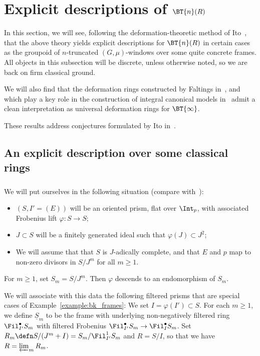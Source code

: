 \documentclass[10pt]{amsart}
\begin{document}
\section{Explicit descriptions of $\BT{n}(R)$}
\label{sec:explicit}

In this section, we will see, following the deformation-theoretic method of Ito~\cite{ito2023deformation}, that the above theory yields explicit descriptions for $\BT{n}(R)$ in certain cases as the groupoid of $n$-truncated $(G,\mu)$-windows over some quite concrete frames. All objects in this subsection will be discrete, unless otherwise noted, so we are back on firm classical ground. 

We will also find that the deformation rings constructed by Faltings in~\cite{faltings:very_ramified}, and which play a key role in the construction of integral canonical models in~\cite{kisin:abelian} admit a clean interpretation as universal deformation rings for $\BT{\infty}$.

These results address conjectures formulated by Ito in~\cite[\S 7]{ito2023deformation}.


\subsection{An explicit description over some classical rings}
\label{subsec:bk_faltings_expl}

\subsubsection{}
We will put ourselves in the following situation (compare with~\cite[\S 6]{lau:displays}): 
\begin{itemize}
   \item $(S,I'=(E))$ will be an oriented prism, flat over $\Int_p$, with associated Frobenius lift $\varphi:S\to S$;
   \item $J\subset S$ will be a finitely generated ideal such that $\varphi(J) \subset J^2$;
   \item We will assume that that $S$ is $J$-adically complete, and that $E$ and $p$ map to non-zero divisors in $S/J^m$ for all $m\ge 1$. 
\end{itemize}
For $m\ge 1$, set $S_m = S/J^m$. Then $\varphi$ descends to an endomorphism of $S_m$.


We will associate with this data the following filtered prisms that are special cases of Example~\ref{example:bk_frames}: We set $I = \varphi(I')\subset S$. For each $m\ge 1$, we define $\underline{S}_m$ to be the frame with underlying non-negatively filtered ring $\Fil^\bullet_{I'} S_m$ with filtered Frobenius $\Fil^\bullet_{I'} S_m\to \Fil^\bullet_{I} S_m$. Set $R_m \defn S/(J^m+I) = S_m/\Fil^1_{I'}S_m$ and $R = S/I$, so that we have $R = \varprojlim_m R_m$.
\end{document}
